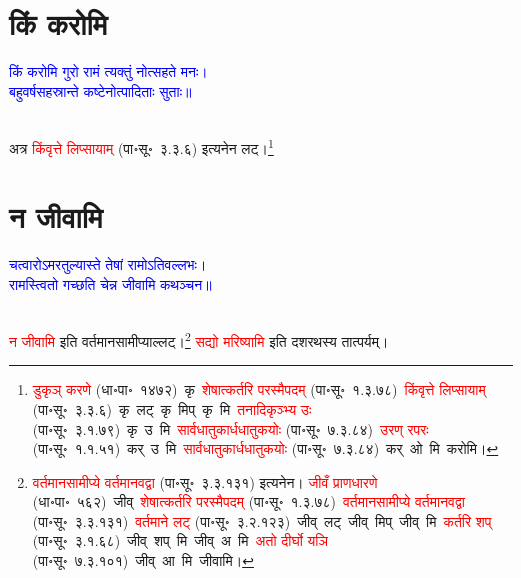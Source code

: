 \section[किं करोमि]{किं करोमि}
\centering\textcolor{blue}{किं करोमि गुरो रामं त्यक्तुं नोत्सहते मनः।\nopagebreak\\
बहुवर्षसहस्रान्ते कष्टेनोत्पादिताः सुताः॥}\nopagebreak\\
\\
\fontsize{14}{21}\selectfont\begin{sloppypar}\justifying\noindent\hspace{10mm} अत्र \textcolor{red}{किंवृत्ते लिप्सायाम्} (पा॰सू॰~३.३.६) इत्यनेन लट्।\footnote{\textcolor{red}{डुकृञ् करणे} (धा॰पा॰~१४७२)~\arrow कृ~\arrow \textcolor{red}{शेषात्कर्तरि परस्मैपदम्} (पा॰सू॰~१.३.७८)~\arrow \textcolor{red}{किंवृत्ते लिप्सायाम्} (पा॰सू॰~३.३.६)~\arrow कृ~लट्~\arrow कृ~मिप्~\arrow कृ~मि~\arrow \textcolor{red}{तनादि\-कृञ्भ्य उः} (पा॰सू॰~३.१.७९)~\arrow कृ~उ~मि~\arrow \textcolor{red}{सार्वधातुकार्ध\-धातुकयोः} (पा॰सू॰~७.३.८४)~\arrow \textcolor{red}{उरण् रपरः} (पा॰सू॰~१.१.५१)~\arrow कर्~उ~मि~\arrow \textcolor{red}{सार्वधातुकार्ध\-धातुकयोः} (पा॰सू॰~७.३.८४)~\arrow कर्~ओ~मि~\arrow करोमि।}\end{sloppypar}
\section[न जीवामि]{न जीवामि}
\centering\textcolor{blue}{चत्वारोऽमरतुल्यास्ते तेषां रामोऽतिवल्लभः।\nopagebreak\\
रामस्त्वितो गच्छति चेन्न जीवामि कथञ्चन॥}\nopagebreak\\
\\
\fontsize{14}{21}\selectfont\begin{sloppypar}\justifying\noindent\hspace{10mm} \textcolor{red}{न जीवामि} इति वर्तमान\-सामीप्याल्लट्।\footnote{\textcolor{red}{वर्तमान\-सामीप्ये वर्तमानवद्वा} (पा॰सू॰~३.३.१३१) इत्यनेन। \textcolor{red}{जीवँ प्राणधारणे} (धा॰पा॰~५६२)~\arrow जीव्~\arrow \textcolor{red}{शेषात्कर्तरि परस्मैपदम्} (पा॰सू॰~१.३.७८)~\arrow \textcolor{red}{वर्तमान\-सामीप्ये वर्तमानवद्वा} (पा॰सू॰~३.३.१३१)~\arrow \textcolor{red}{वर्तमाने लट्} (पा॰सू॰~३.२.१२३)~\arrow जीव्~लट्~\arrow जीव्~मिप्~\arrow जीव्~मि~\arrow \textcolor{red}{कर्तरि शप्‌} (पा॰सू॰~३.१.६८)~\arrow जीव्~शप्~मि~\arrow जीव्~अ~मि~\arrow \textcolor{red}{अतो दीर्घो यञि} (पा॰सू॰~७.३.१०१)~\arrow जीव्~आ~मि~\arrow जीवामि।} \textcolor{red}{सद्यो मरिष्यामि} इति दशरथस्य तात्पर्यम्।\end{sloppypar}
